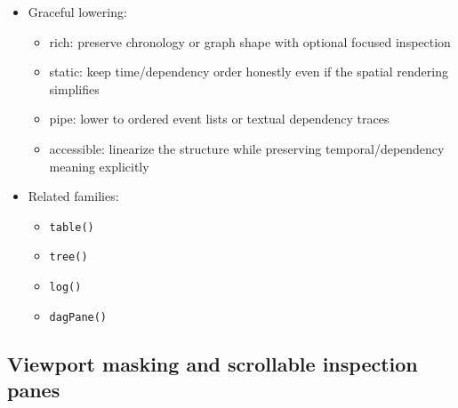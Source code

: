 \begin{itemize}
  \begin{itemize}
  \tightlist
  \item
    core plus TUI interaction layer
  \end{itemize}
\item
  Graceful lowering:

  \begin{itemize}
  \tightlist
  \item
    rich: preserve chronology or graph shape with optional focused inspection
  \item
    static: keep time/dependency order honestly even if the spatial rendering simplifies
  \item
    pipe: lower to ordered event lists or textual dependency traces
  \item
    accessible: linearize the structure while preserving temporal/dependency meaning explicitly
  \end{itemize}
\item
  Related families:

  \begin{itemize}
  \tightlist
  \item
    \texttt{t\allowbreak{}a\allowbreak{}b\allowbreak{}l\allowbreak{}e\allowbreak{}(\allowbreak{})}
  \item
    \texttt{t\allowbreak{}r\allowbreak{}e\allowbreak{}e\allowbreak{}(\allowbreak{})}
  \item
    \texttt{l\allowbreak{}o\allowbreak{}g\allowbreak{}(\allowbreak{})}
  \item
    \texttt{d\allowbreak{}a\allowbreak{}g\allowbreak{}P\allowbreak{}a\allowbreak{}n\allowbreak{}e\allowbreak{}(\allowbreak{})}
  \end{itemize}
\end{itemize}

\subsection{Viewport masking and scrollable inspection panes}\label{record-019-viewport-masking-and-scrollable-inspection-panes}

